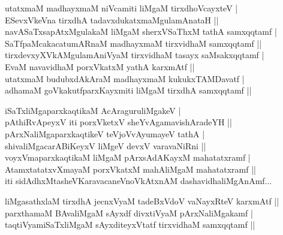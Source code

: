 \begin{entry}
\smallskip
\begin{shl}
utatxmaM madhayxmaM niVcamiti liMgaM tirxdhoVcayxteV |\\
ESevxVkeVna tirxdhA tadavxdukatxmaMgulamAnataH ||\\
navASaTxsapAtxMgulakaM liMgaM sherxVSaThxM tathA samxqqtamf |\\
SaTfpaMcakacatumARnaM madhayxmaM tirxvidhaM samxqqtamf ||\\
tirxdevxyXVkAMgulamAniVyaM tirxvidhaM tasayx saMsakxqqtamf |\\
EvaM navavidhaM porxVkatxM yathA karxmAtf ||\\
utatxmaM budubxdAkAraM madhayxmaM kukukxTAMDavatf |\\
adhamaM goVkakutfparxKayxmiti liMgaM tirxdhA samxqqtamf ||
\end{shl}
\medskip
{}
\smallskip
\begin{shl}
iSaTxliMgaparxkaqtikaM AcAraguruliMgakeV |\\
pAthiRvApeyxV iti porxVketxV sheYvAgamavishAradeYH ||\\
pArxNaliMgaparxkaqtikeV teVjoVvAyumayeV tathA |\\
shivaliMgacarABiKeyxV liMgeV devxV varavaNiRni ||\\
voyxVmaparxkaqtikaM liMgaM pArxsAdAKayxM mahatatxramf |\\
AtamxtatatxvXmayaM porxVkatxM mahAliMgaM mahatatxramf ||\\
iti sidAdhxMtasheVKaravacaneVnoVkAtxnAM dashavidhaliMgAnAmf...
\end{shl}
\medskip
{}
\smallskip
\begin{shl}
liMgasathxlaM tirxdhA jecnxVyaM tadeBxVdoV vaNayxRteV karxmAtf ||\\
parxthamaM BAvaliMgaM sAyxdf divxtiVyaM pArxNaliMgakamf |\\
taqtiVyamiSaTxliMgaM sAyxditeyxVtatf tirxvidhaM samxqqtamf ||\\

\end{shl}
\end{entry}
